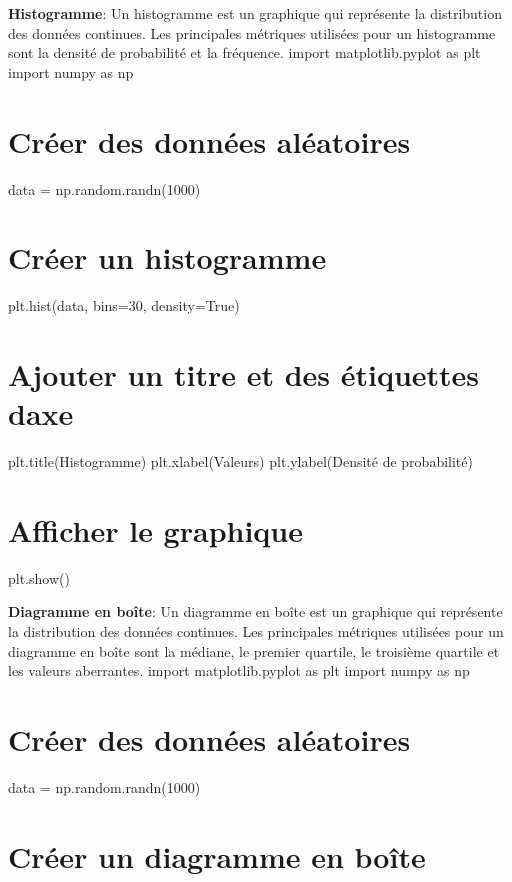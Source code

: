 
\begin{DoxyEnumerate}
\item {\bfseries Histogramme}\+: Un histogramme est un graphique qui représente la distribution des données continues. Les principales métriques utilisées pour un histogramme sont la densité de probabilité et la fréquence. import matplotlib.\+pyplot as plt import numpy as np \section*{Créer des données aléatoires}
\end{DoxyEnumerate}

data = np.\+random.\+randn(1000) \section*{Créer un histogramme}

plt.\+hist(data, bins=30, density=True) \section*{Ajouter un titre et des étiquettes d\textquotesingle{}axe}

plt.\+title(\textquotesingle{}Histogramme\textquotesingle{}) plt.\+xlabel(\textquotesingle{}Valeurs\textquotesingle{}) plt.\+ylabel(\textquotesingle{}Densité de probabilité\textquotesingle{}) \section*{Afficher le graphique}

plt.\+show()


\begin{DoxyEnumerate}
\item {\bfseries Diagramme en boîte}\+: Un diagramme en boîte est un graphique qui représente la distribution des données continues. Les principales métriques utilisées pour un diagramme en boîte sont la médiane, le premier quartile, le troisième quartile et les valeurs aberrantes. import matplotlib.\+pyplot as plt import numpy as np \section*{Créer des données aléatoires}
\end{DoxyEnumerate}

data = np.\+random.\+randn(1000) \section*{Créer un diagramme en boîte}

